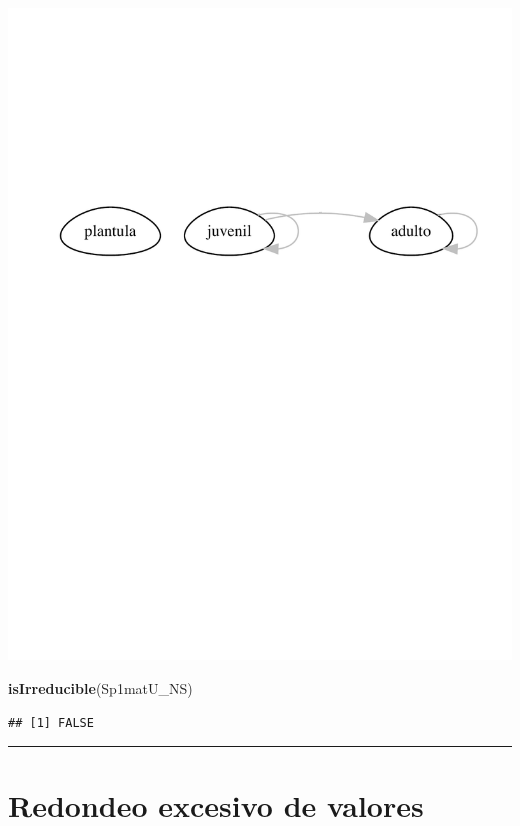 \documentclass[
]{book}
\newenvironment{Shaded}{\begin{snugshade}}{\end{snugshade}}
\newcommand{\FunctionTok}[1]{\textcolor[rgb]{0.13,0.29,0.53}{\textbf{#1}}}
\newcommand{\NormalTok}[1]{#1}
\theoremstyle{definition}
\theoremstyle{definition}
\theoremstyle{definition}
\theoremstyle{definition}
\theoremstyle{remark}
\begin{document}
\includegraphics{Diagnostico_Poblacional_files/figure-latex/unnamed-chunk-43-1.pdf}

\begin{Shaded}
\begin{Highlighting}[]
\FunctionTok{isIrreducible}\NormalTok{(Sp1matU\_NS)}
\end{Highlighting}
\end{Shaded}

\begin{verbatim}
## [1] FALSE
\end{verbatim}

\begin{center}\rule{0.5\linewidth}{0.5pt}\end{center}

\section{Redondeo excesivo de valores}\label{redondeo-excesivo-de-valores}
\end{document}
